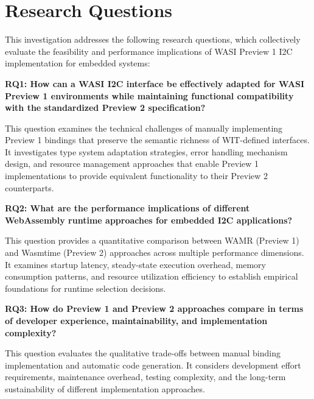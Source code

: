 \section{Research Questions}
\label{sec:research-questions}

This investigation addresses the following research questions, which collectively evaluate the feasibility and performance implications of WASI Preview 1 I2C implementation for embedded systems:

\textbf{RQ1: How can a WASI I2C interface be effectively adapted for WASI Preview 1 environments while maintaining functional compatibility with the standardized Preview 2 specification?}

This question examines the technical challenges of manually implementing Preview 1 bindings that preserve the semantic richness of WIT-defined interfaces. It investigates type system adaptation strategies, error handling mechanism design, and resource management approaches that enable Preview 1 implementations to provide equivalent functionality to their Preview 2 counterparts.

\textbf{RQ2: What are the performance implications of different WebAssembly runtime approaches for embedded I2C applications?}

This question provides a quantitative comparison between WAMR (Preview 1) and Wasmtime (Preview 2) approaches across multiple performance dimensions. It examines startup latency, steady-state execution overhead, memory consumption patterns, and resource utilization efficiency to establish empirical foundations for runtime selection decisions.

\textbf{RQ3: How do Preview 1 and Preview 2 approaches compare in terms of developer experience, maintainability, and implementation complexity?}

This question evaluates the qualitative trade-offs between manual binding implementation and automatic code generation. It considers development effort requirements, maintenance overhead, testing complexity, and the long-term sustainability of different implementation approaches.




